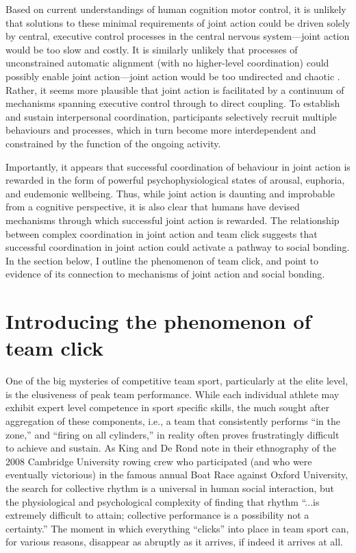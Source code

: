 \begin{CJK}{UTF8}{gbsn}
Based on current understandings of human cognition motor control, it is unlikely that solutions to these minimal requirements of joint action could be driven solely by central, executive control processes in the central nervous system---joint action would be too slow and costly.  It is similarly unlikely that processes of unconstrained automatic alignment (with no higher-level coordination) could possibly enable joint action---joint action would be too undirected and chaotic \citep{Fusaroli2014}.  Rather, it seems more plausible that joint action is facilitated by a continuum of mechanisms spanning executive control through to direct coupling.  To establish and sustain interpersonal coordination, participants selectively recruit multiple behaviours and processes, which in turn become more interdependent and constrained by the function of the ongoing activity.

Importantly, it appears that successful coordination of behaviour in joint action is rewarded in the form of powerful psychophysiological states of arousal, euphoria, and eudemonic wellbeing.  Thus, while joint action is daunting and improbable from a cognitive perspective, it is also clear that humans have devised mechanisms through which successful joint action is rewarded. The relationship between complex coordination in joint action and team click suggests that successful coordination in joint action could activate a pathway to social bonding.  In the section below, I outline the phenomenon of team click, and point to evidence of its connection to mechanisms of joint action and social bonding.


\section{Introducing the phenomenon of team click\label{sect:teamClickIntro}}

One of the big mysteries of competitive team sport, particularly at the elite level, is the elusiveness of peak team performance.  While each individual athlete may exhibit expert level competence in sport specific skills, the much sought after aggregation of these components, i.e., a team that consistently performs ``in the zone,'' and ``firing on all cylinders,'' in reality often proves frustratingly difficult to achieve and sustain.  As King and De Rond \textcite[568]{King2011} note in their ethnography of the 2008 Cambridge University rowing crew who participated (and who were eventually victorious) in the famous annual Boat Race against Oxford University, the search for collective rhythm is a universal in human social interaction, but  the physiological and psychological complexity of finding that rhythm ``...is extremely difficult to attain; collective performance is a possibility not a certainty.''   The moment in which everything ``clicks'' into place in team sport can, for various reasons, disappear as abruptly as it arrives, if indeed it arrives at all.


\end{CJK}
